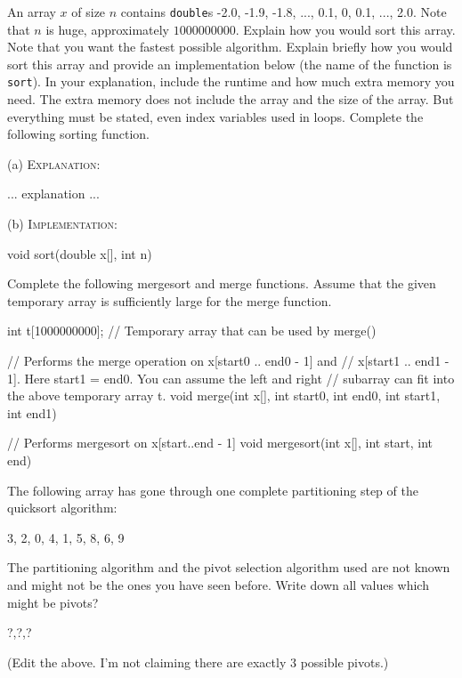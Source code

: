 \newpage
\nextq
An array $x$ of size $n$ contains \verb!double!s
-2.0, -1.9, -1.8, ..., 0.1, 0, 0.1, ..., 2.0.
Note that $n$ is huge, approximately $1000000000$.
Explain how you would sort this array.
Note that you want the fastest possible algorithm.
Explain briefly how you would sort this array and provide an implementation below
(the name of the function is \verb!sort!).
In your explanation, include the runtime and how much extra memory you need.
The extra memory does not include the array and the size of the array.
But everything must be stated, even index variables used in loops. 
Complete the following sorting function.

\ANSWER

(a) \textsc{Explanation:}\vspace{-3mm}
\begin{answerlong}
... explanation ...
\end{answerlong}

(b) \textsc{Implementation:}\vspace{-2mm}
\begin{answercode}
void sort(double x[], int n)
{  
}  
\end{answercode}

\newpage
\nextq
Complete the following mergesort and merge functions.
Assume that the given temporary array is sufficiently large for
the merge function.

\ANSWER
\begin{answercode}
int t[1000000000]; // Temporary array that can be used by merge()

// Performs the merge operation on x[start0 .. end0 - 1] and
// x[start1 .. end1 - 1]. Here start1 = end0. You can assume the left and right
// subarray can fit into the above temporary array t.
void merge(int x[], int start0, int end0, int start1, int end1)
{
}

// Performs mergesort on x[start..end - 1]
void mergesort(int x[], int start, int end)
{  
}
\end{answercode}

\newpage
\nextq %
The following array has gone through one complete
partitioning step of the quicksort algorithm:
\begin{console}
{3, 2, 0, 4, 1, 5, 8, 6, 9}
\end{console}
The partitioning algorithm and the pivot selection algorithm
used are not known and might not be the ones you have seen before.
Write down all values which might be pivots?
\\
\ANSWER
\begin{answercode}
?,?,?
\end{answercode}
(Edit the above. I'm not claiming there are exactly 3 possible pivots.)

